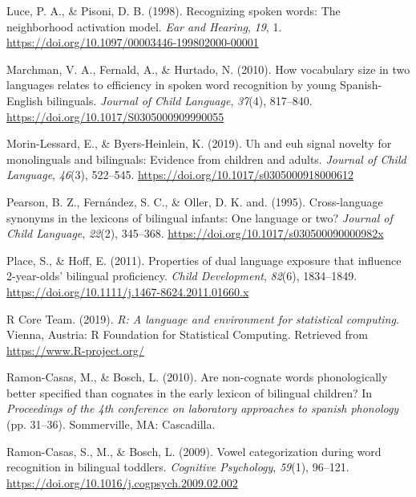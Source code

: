 \documentclass[
  ,man,floatsintext]{apa6}
\newlength{\cslhangindent}
\newlength{\cslentryspacingunit} %
\newenvironment{CSLReferences}[2] %
 {%
  \setlength{\parindent}{0pt}
  \ifodd #1
  \let\oldpar\par
  \def\par{\hangindent=\cslhangindent\oldpar}
  \fi
  \setlength{\parskip}{#2\cslentryspacingunit}
 }%
 {}
\begin{document}
\begin{CSLReferences}{1}{0}
\leavevmode{}%
Luce, P. A., \& Pisoni, D. B. (1998). Recognizing spoken words: The neighborhood activation model. \emph{Ear and Hearing}, \emph{19}, 1. \url{https://doi.org/10.1097/00003446-199802000-00001}

\leavevmode{}%
Marchman, V. A., Fernald, A., \& Hurtado, N. (2010). How vocabulary size in two languages relates to efficiency in spoken word recognition by young {S}panish-{E}nglish bilinguals. \emph{Journal of Child Language}, \emph{37}(4), 817--840. \url{https://doi.org/10.1017/S0305000909990055}

\leavevmode{}%
Morin-Lessard, E., \& Byers-Heinlein, K. (2019). Uh and euh signal novelty for monolinguals and bilinguals: Evidence from children and adults. \emph{Journal of Child Language}, \emph{46}(3), 522--545. \url{https://doi.org/10.1017/s0305000918000612}

\leavevmode{}%
Pearson, B. Z., Fernández, S. C., \& Oller, D. K. and. (1995). Cross-language synonyms in the lexicons of bilingual infants: One language or two? \emph{Journal of Child Language}, \emph{22}(2), 345--368. \url{https://doi.org/10.1017/s030500090000982x}

\leavevmode{}%
Place, S., \& Hoff, E. (2011). Properties of dual language exposure that influence 2-year-olds' bilingual proficiency. \emph{Child Development}, \emph{82}(6), 1834--1849. \url{https://doi.org/10.1111/j.1467-8624.2011.01660.x}

\leavevmode{}%
R Core Team. (2019). \emph{R: A language and environment for statistical computing}. Vienna, Austria: R Foundation for Statistical Computing. Retrieved from \url{https://www.R-project.org/}

\leavevmode{}%
Ramon-Casas, M., \& Bosch, L. (2010). Are non-cognate words phonologically better specified than cognates in the early lexicon of bilingual children? In \emph{Proceedings of the 4th conference on laboratory approaches to spanish phonology} (pp. 31--36). Sommerville, MA: Cascadilla.

\leavevmode{}%
Ramon-Casas, S., M., \& Bosch, L. (2009). Vowel categorization during word recognition in bilingual toddlers. \emph{Cognitive Psychology}, \emph{59}(1), 96--121. \url{https://doi.org/10.1016/j.cogpsych.2009.02.002}


\end{CSLReferences}
\end{document}

